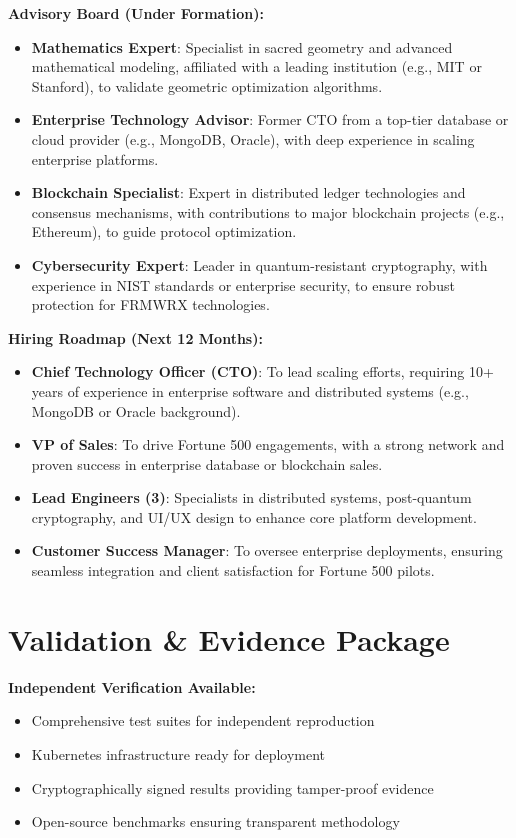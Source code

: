 \documentclass{article}
\begin{document}
\textbf{Advisory Board (Under Formation):}
\begin{itemize}
    \item \textbf{Mathematics Expert}: Specialist in sacred geometry and advanced mathematical modeling, affiliated with a leading institution (e.g., MIT or Stanford), to validate geometric optimization algorithms.
    \item \textbf{Enterprise Technology Advisor}: Former CTO from a top-tier database or cloud provider (e.g., MongoDB, Oracle), with deep experience in scaling enterprise platforms.
    \item \textbf{Blockchain Specialist}: Expert in distributed ledger technologies and consensus mechanisms, with contributions to major blockchain projects (e.g., Ethereum), to guide protocol optimization.
    \item \textbf{Cybersecurity Expert}: Leader in quantum-resistant cryptography, with experience in NIST standards or enterprise security, to ensure robust protection for FRMWRX technologies.
\end{itemize}

\textbf{Hiring Roadmap (Next 12 Months):}
\begin{itemize}
    \item \textbf{Chief Technology Officer (CTO)}: To lead scaling efforts, requiring 10+ years of experience in enterprise software and distributed systems (e.g., MongoDB or Oracle background).
    \item \textbf{VP of Sales}: To drive Fortune 500 engagements, with a strong network and proven success in enterprise database or blockchain sales.
    \item \textbf{Lead Engineers (3)}: Specialists in distributed systems, post-quantum cryptography, and UI/UX design to enhance core platform development.
    \item \textbf{Customer Success Manager}: To oversee enterprise deployments, ensuring seamless integration and client satisfaction for Fortune 500 pilots.
\end{itemize}

\section{Validation \& Evidence Package}
\textbf{Independent Verification Available:}
\begin{itemize}
    \item Comprehensive test suites for independent reproduction
    \item Kubernetes infrastructure ready for deployment
    \item Cryptographically signed results providing tamper-proof evidence
    \item Open-source benchmarks ensuring transparent methodology
\end{itemize}
\end{document}
